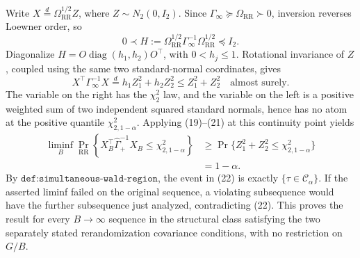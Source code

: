 Write \(X\stackrel d=\Omega_{\mathrm{RR}}^{1/2}Z\), where \(Z\sim N_2(0,I_2)\).  Since \(\Gamma_\infty\succeq\Omega_{\mathrm{RR}}\succ0\), inversion reverses Loewner order, so
\[
 0\prec
 H:=\Omega_{\mathrm{RR}}^{1/2}
       \Gamma_\infty^{-1}
       \Omega_{\mathrm{RR}}^{1/2}
 \preceq I_2.                                               \tag{20}
\]
Diagonalize \(H=O\operatorname{diag}(h_1,h_2)O^\top\), with \(0<h_j\leq1\).  Rotational invariance of \(Z\), coupled using the same two standard-normal coordinates, gives
\[
 X^\top\Gamma_\infty^{-1}X
 \stackrel d=h_1Z_1^2+h_2Z_2^2
 \leq Z_1^2+Z_2^2
 \quad\text{almost surely}.                                \tag{21}
\]
The variable on the right has the \(\chi^2_2\) law, and the variable on the left is a positive weighted sum of two independent squared standard normals, hence has no atom at the positive quantile \(\chi^2_{2,1-\alpha}\).  Applying (19)--(21) at this continuity point yields
\[
 \begin{aligned}
 \liminf_B\Pr_{\mathrm{RR}}\!\left\{
  X_B^\top\widehat\Gamma_+^{-1}X_B
  \leq\chi^2_{2,1-\alpha}\right\}
 &\geq
 \Pr\{Z_1^2+Z_2^2\leq\chi^2_{2,1-\alpha}\}\\
 &=1-\alpha.                                                \tag{22}
 \end{aligned}
\]
By \(\texttt{def:simultaneous-wald-region}\), the event in (22) is exactly \(\{\tau\in\mathcal C_\alpha\}\).  If the asserted liminf failed on the original sequence, a violating subsequence would have the further subsequence just analyzed, contradicting (22).  This proves the result for every \(B\to\infty\) sequence in the structural class satisfying the two separately stated rerandomization covariance conditions, with no restriction on \(G/B\).